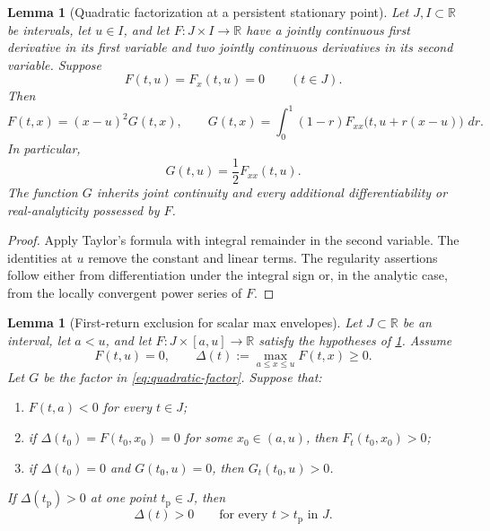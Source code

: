 \documentclass[11pt]{article}
\theoremstyle{plain}
\newtheorem{lemma}[theorem]{Lemma}
\theoremstyle{definition}
\theoremstyle{remark}
\newcommand{\R}{\mathbb R}
\newcommand{\dd}{\,d}
\begin{document}
\begin{lemma}[Quadratic factorization at a persistent stationary point]\label{lem:quadratic-factor}
Let \(J,I\subset\R\) be intervals, let \(u\in I\), and let \(F:J\times I\to\R\) have a jointly continuous first derivative in its first variable and two jointly continuous derivatives in its second variable.  Suppose
\[
F(t,u)=F_x(t,u)=0
\qquad(t\in J).
\]
Then
\begin{equation}\label{eq:quadratic-factor}
F(t,x)=(x-u)^2G(t,x),
\qquad
G(t,x)=\int_0^1(1-r)F_{xx}\bigl(t,u+r(x-u)\bigr)\,\dd r.
\end{equation}
In particular,
\[
G(t,u)=\frac12F_{xx}(t,u).
\]
The function \(G\) inherits joint continuity and every additional differentiability or real-analyticity possessed by \(F\).
\end{lemma}

\begin{proof}
Apply Taylor's formula with integral remainder in the second variable.  The identities at \(u\) remove the constant and linear terms.  The regularity assertions follow either from differentiation under the integral sign or, in the analytic case, from the locally convergent power series of \(F\).
\end{proof}

\begin{lemma}[First-return exclusion for scalar max envelopes]\label{lem:first-return}
Let \(J\subset\R\) be an interval, let \(a<u\), and let \(F:J\times[a,u]\to\R\) satisfy the hypotheses of \cref{lem:quadratic-factor}.  Assume
\[
F(t,u)=0,
\qquad
\Delta(t):=\max_{a\le x\le u}F(t,x)\ge0.
\]
Let \(G\) be the factor in \eqref{eq:quadratic-factor}.  Suppose that:
\begin{enumerate}[label=\textup{(\roman*)}]
\item \(F(t,a)<0\) for every \(t\in J\);
\item if \(\Delta(t_0)=F(t_0,x_0)=0\) for some \(x_0\in(a,u)\), then \(F_t(t_0,x_0)>0\);
\item if \(\Delta(t_0)=0\) and \(G(t_0,u)=0\), then \(G_t(t_0,u)>0\).
\end{enumerate}
If \(\Delta(t_{\mathrm p})>0\) at one point \(t_{\mathrm p}\in J\), then
\[
\Delta(t)>0
\qquad
\text{for every }t>t_{\mathrm p}\text{ in }J.
\]
\end{lemma}
\end{document}
